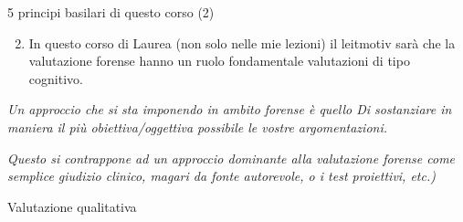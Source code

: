 \documentclass[
  ignorenonframetext,
]{beamer}
\providecommand{\tightlist}{%
  \setlength{\itemsep}{0pt}\setlength{\parskip}{0pt}}
\begin{document}
\begin{frame}{5 principi basilari di questo corso (2)}
\label{principi-basilari-di-questo-corso-2}
\begin{enumerate}[<+->]
\setcounter{enumi}{1}
\tightlist
\item
  In questo corso di Laurea (non solo nelle mie lezioni) il leitmotiv
  sarà che la valutazione forense hanno un ruolo fondamentale
  valutazioni di tipo cognitivo.
\end{enumerate}

\vspace{3em}

\emph{Un approccio che si sta imponendo in ambito forense è quello Di
sostanziare in maniera il più obiettiva/oggettiva possibile le vostre
argomentazioni.}

\emph{Questo si contrappone ad un approccio dominante alla valutazione
forense come semplice giudizio clinico, magari da fonte autorevole, o i
test proiettivi, etc.)}
\end{frame}

\begin{frame}{Valutazione qualitativa}
\label{valutazione-qualitativa}
\begin{center}
\end{center}
\end{frame}
\end{document}
